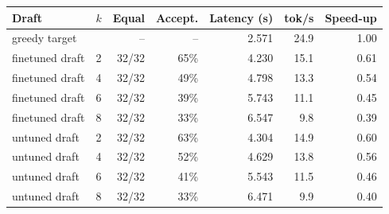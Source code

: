 \begin{tabular}{llrrrrr}\toprule
Draft & $k$ & Equal & Accept. & Latency (s) & tok/s & Speed-up \\\midrule
\multicolumn{2}{l}{greedy target} & -- & -- & 2.571 & 24.9 & 1.00 \\\midrule
finetuned draft & 2 & 32/32 & 65\% & 4.230 & 15.1 & 0.61 \\
finetuned draft & 4 & 32/32 & 49\% & 4.798 & 13.3 & 0.54 \\
finetuned draft & 6 & 32/32 & 39\% & 5.743 & 11.1 & 0.45 \\
finetuned draft & 8 & 32/32 & 33\% & 6.547 & 9.8 & 0.39 \\
untuned draft & 2 & 32/32 & 63\% & 4.304 & 14.9 & 0.60 \\
untuned draft & 4 & 32/32 & 52\% & 4.629 & 13.8 & 0.56 \\
untuned draft & 6 & 32/32 & 41\% & 5.543 & 11.5 & 0.46 \\
untuned draft & 8 & 32/32 & 33\% & 6.471 & 9.9 & 0.40 \\
\bottomrule\end{tabular}
